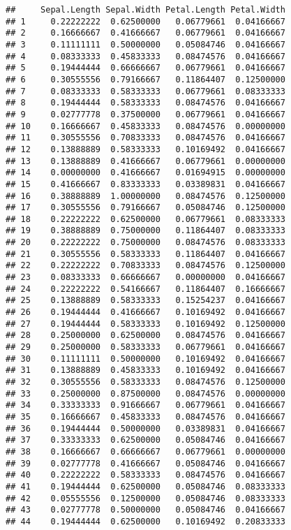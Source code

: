 \documentclass[
]{article}
\begin{document}
\begin{verbatim}
##     Sepal.Length Sepal.Width Petal.Length Petal.Width
## 1     0.22222222  0.62500000   0.06779661  0.04166667
## 2     0.16666667  0.41666667   0.06779661  0.04166667
## 3     0.11111111  0.50000000   0.05084746  0.04166667
## 4     0.08333333  0.45833333   0.08474576  0.04166667
## 5     0.19444444  0.66666667   0.06779661  0.04166667
## 6     0.30555556  0.79166667   0.11864407  0.12500000
## 7     0.08333333  0.58333333   0.06779661  0.08333333
## 8     0.19444444  0.58333333   0.08474576  0.04166667
## 9     0.02777778  0.37500000   0.06779661  0.04166667
## 10    0.16666667  0.45833333   0.08474576  0.00000000
## 11    0.30555556  0.70833333   0.08474576  0.04166667
## 12    0.13888889  0.58333333   0.10169492  0.04166667
## 13    0.13888889  0.41666667   0.06779661  0.00000000
## 14    0.00000000  0.41666667   0.01694915  0.00000000
## 15    0.41666667  0.83333333   0.03389831  0.04166667
## 16    0.38888889  1.00000000   0.08474576  0.12500000
## 17    0.30555556  0.79166667   0.05084746  0.12500000
## 18    0.22222222  0.62500000   0.06779661  0.08333333
## 19    0.38888889  0.75000000   0.11864407  0.08333333
## 20    0.22222222  0.75000000   0.08474576  0.08333333
## 21    0.30555556  0.58333333   0.11864407  0.04166667
## 22    0.22222222  0.70833333   0.08474576  0.12500000
## 23    0.08333333  0.66666667   0.00000000  0.04166667
## 24    0.22222222  0.54166667   0.11864407  0.16666667
## 25    0.13888889  0.58333333   0.15254237  0.04166667
## 26    0.19444444  0.41666667   0.10169492  0.04166667
## 27    0.19444444  0.58333333   0.10169492  0.12500000
## 28    0.25000000  0.62500000   0.08474576  0.04166667
## 29    0.25000000  0.58333333   0.06779661  0.04166667
## 30    0.11111111  0.50000000   0.10169492  0.04166667
## 31    0.13888889  0.45833333   0.10169492  0.04166667
## 32    0.30555556  0.58333333   0.08474576  0.12500000
## 33    0.25000000  0.87500000   0.08474576  0.00000000
## 34    0.33333333  0.91666667   0.06779661  0.04166667
## 35    0.16666667  0.45833333   0.08474576  0.04166667
## 36    0.19444444  0.50000000   0.03389831  0.04166667
## 37    0.33333333  0.62500000   0.05084746  0.04166667
## 38    0.16666667  0.66666667   0.06779661  0.00000000
## 39    0.02777778  0.41666667   0.05084746  0.04166667
## 40    0.22222222  0.58333333   0.08474576  0.04166667
## 41    0.19444444  0.62500000   0.05084746  0.08333333
## 42    0.05555556  0.12500000   0.05084746  0.08333333
## 43    0.02777778  0.50000000   0.05084746  0.04166667
## 44    0.19444444  0.62500000   0.10169492  0.20833333

\end{verbatim}
\end{document}
